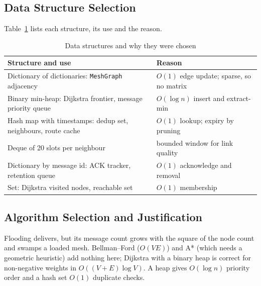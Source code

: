 \subsection{Data Structure Selection}
Table~\ref{tab:ds} lists each structure, its use and the reason.
\begin{table}[!htbp]
\caption{Data structures and why they were chosen}
\label{tab:ds}
\footnotesize
\begin{tabularx}{\textwidth}{@{}>{\raggedright\arraybackslash}p{8.8cm}>{\raggedright\arraybackslash}X@{}}
\toprule
\textbf{Structure and use} & \textbf{Reason}\\ \midrule
Dictionary of dictionaries: \texttt{MeshGraph} adjacency & $O(1)$ edge update; sparse, so no matrix\\
Binary min-heap: Dijkstra frontier, message priority queue & $O(\log n)$ insert and extract-min\\
Hash map with timestamps: dedup set, neighbours, route cache & $O(1)$ lookup; expiry by pruning\\
Deque of 20 slots per neighbour & bounded window for link quality\\
Dictionary by message id: ACK tracker, retention queue & $O(1)$ acknowledge and removal\\
Set: Dijkstra visited nodes, reachable set & $O(1)$ membership\\
\bottomrule
\end{tabularx}
\end{table}

\subsection{Algorithm Selection and Justification}
Flooding delivers, but its message count grows with the square of the node count and swamps a loaded mesh. Bellman--Ford ($O(VE)$) and A* (which needs a geometric heuristic) add nothing here; Dijkstra with a binary heap is correct for non-negative weights in $O((V+E)\log V)$. A heap gives $O(\log n)$ priority order and a hash set $O(1)$ duplicate checks.
